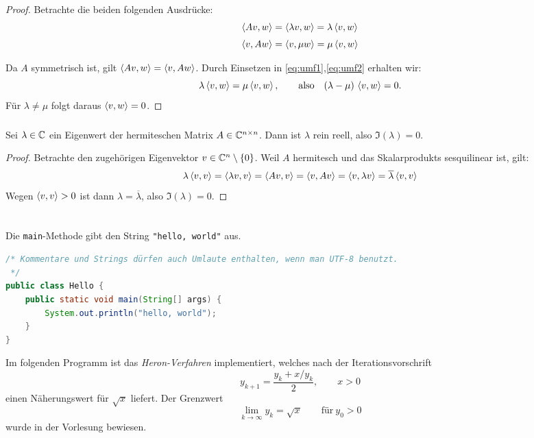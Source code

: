 \documentclass[parskip=half-,DIV14,10pt]{scrartcl}
\begin{document}
\begin{proof}
Betrachte die beiden folgenden Ausdrücke:
\begin{align}
\label{eq:umf1}
\left\langle Av,w\right\rangle&=\left\langle\lambda v,w\right\rangle=\lambda\left\langle v,w\right\rangle\\[3pt]
\label{eq:umf2}
\left\langle v,Aw\right\rangle&=\left\langle v,\mu w\right\rangle=\mu\left\langle v,w\right\rangle
\end{align}

Da $A$ symmetrisch ist, gilt $\left\langle Av,w\right\rangle=\left\langle v,Aw\right\rangle$.  Durch
Einsetzen in \eqref{eq:umf1},\eqref{eq:umf2} erhalten wir:
\[
\lambda\left\langle v,w\right\rangle=\mu\left\langle v,w\right\rangle,\qquad
\text{also}\quad
(\lambda-\mu)\,\left\langle v,w\right\rangle=0.
\]
Für $\lambda\neq\mu$ folgt daraus $\left\langle v,w\right\rangle=0$.
\end{proof}

\subsubsection{}

\begin{toshow}
Sei $\lambda\in\mathbb{C}$ ein Eigenwert der hermiteschen Matrix
$A\in\mathbb{C}^{n\times n}$.  Dann ist $\lambda$ rein reell, also
$\Im(\lambda)=0$.
\end{toshow}

\begin{proof}
Betrachte den zugehörigen Eigenvektor $v\in\mathbb{C}^n\setminus\{0\}$.  Weil
$A$ hermitesch und das Skalarprodukts sesquilinear ist, gilt:
\[
\lambda\left\langle v,v\right\rangle=\left\langle\lambda v,v\right\rangle=\left\langle Av,v\right\rangle=\left\langle v,Av\right\rangle
=\left\langle v,\lambda v\right\rangle=\overline{\lambda}\left\langle v,v\right\rangle
\]
Wegen $\left\langle v,v\right\rangle>0$ ist dann $\lambda=\overline{\lambda}$, also
$\Im(\lambda)=0$.
\end{proof}


\section{}

Die \lstinline!main!-Methode gibt den String \lstinline!"hello, world"! aus.
\begin{lstlisting}[language=java]
/* Kommentare und Strings dürfen auch Umlaute enthalten, wenn man UTF-8 benutzt.
 */
public class Hello {
    public static void main(String[] args) {
        System.out.println("hello, world");
    }
}
\end{lstlisting}

Im folgenden Programm ist das \emph{Heron-Verfahren} implementiert,
welches nach der Iterationsvorschrift
\[
y_{k+1} = \frac{y_k+x/y_k}{2},\qquad x>0
\]
einen Näherungswert für $\sqrt{x}$ liefert.  Der Grenzwert
\[
\lim_{k\to\infty}y_k = \sqrt{x}\qquad\text{für}~y_0>0
\]
wurde in der Vorlesung bewiesen.

\end{document}
